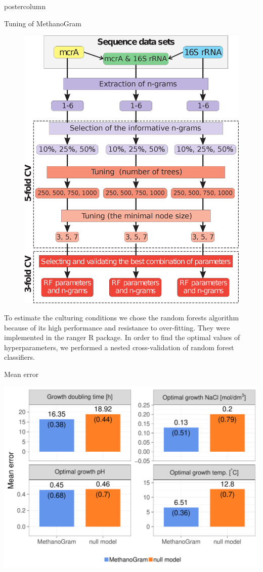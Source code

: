 \documentclass[final]{beamer}\usepackage[]{graphicx}\usepackage[]{color}
\makeatletter
\def\maxwidth{ %
  \ifdim\Gin@nat@width>\linewidth
    \linewidth
  \else
    \Gin@nat@width
  \fi
}
\newenvironment{knitrout}{}{} %
\def\maxwidth{ %
  \ifdim\Gin@nat@width>\linewidth
    \linewidth
  \else
    \Gin@nat@width
  \fi
}
\newenvironment{knitrout}{}{} %
\makeatother
\begin{document}
\begin{frame}
\begin{columns}
\begin{column}{.48\textwidth}
\begin{beamercolorbox}[center,wd=\textwidth]{postercolumn}
\begin{minipage}[T]{.95\textwidth}
{\begin{block}{Tuning of MethanoGram}
\begin{figure}
\includegraphics[width=0.7\columnwidth]{suplem2.eps}
\end{figure}


To estimate the culturing conditions we chose the random forests algorithm because of its high performance
and resistance to over-fitting\citep{breiman_random_2001}. They were implemented in the ranger R package\citep{wright_ranger:_2015}. In order to find the optimal values of hyperparameters, we performed a nested cross-validation of random forest classifiers.

\end{block}


\begin{block}{Mean error}


\begin{knitrout}
\color{fgcolor}

{\centering \includegraphics[width=\maxwidth]{figure/unnamed-chunk-1-1} 

}
\end{knitrout}
\end{block}}
\end{minipage}
\end{beamercolorbox}
\end{column}
\end{columns}
\end{frame}
\end{document}

